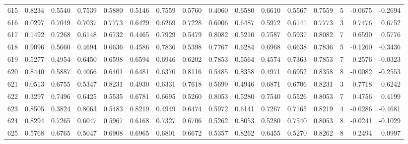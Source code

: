 \begin{tabular}{lrrrrrrrrrrrrrrr}
615 &      0.8234 &  0.5540 &  0.7539 &  0.5880 &  0.5146 &  0.7559 &  0.5760 &  0.4060 &  0.6580 &  0.6610 &   0.5567 &     0.7559 &      5 &                   -0.0675 &                    -0.2694 \\
616 &      0.0297 &  0.7049 &  0.7037 &  0.7773 &  0.6429 &  0.6269 &  0.7228 &  0.6006 &  0.6487 &  0.5972 &   0.6141 &     0.7773 &      3 &                    0.7476 &                     0.6752 \\
617 &      0.1492 &  0.7268 &  0.6148 &  0.6732 &  0.4465 &  0.7929 &  0.5479 &  0.8082 &  0.5210 &  0.7587 &   0.5937 &     0.8082 &      7 &                    0.6590 &                     0.5776 \\
618 &      0.9096 &  0.5660 &  0.4694 &  0.6636 &  0.4586 &  0.7836 &  0.5398 &  0.7767 &  0.6284 &  0.6968 &   0.6638 &     0.7836 &      5 &                   -0.1260 &                    -0.3436 \\
619 &      0.5277 &  0.4954 &  0.6450 &  0.6598 &  0.6594 &  0.6946 &  0.6202 &  0.7853 &  0.5564 &  0.4574 &   0.7363 &     0.7853 &      7 &                    0.2576 &                    -0.0323 \\
620 &      0.8440 &  0.5887 &  0.4066 &  0.6401 &  0.6481 &  0.6370 &  0.8116 &  0.5485 &  0.8358 &  0.4971 &   0.6952 &     0.8358 &      8 &                   -0.0082 &                    -0.2553 \\
621 &      0.0513 &  0.6755 &  0.5347 &  0.8231 &  0.4930 &  0.6331 &  0.7618 &  0.5699 &  0.4946 &  0.6871 &   0.6706 &     0.8231 &      3 &                    0.7718 &                     0.6242 \\
622 &      0.3297 &  0.7496 &  0.6425 &  0.5535 &  0.6781 &  0.6695 &  0.5260 &  0.8053 &  0.5280 &  0.7540 &   0.5526 &     0.8053 &      7 &                    0.4756 &                     0.4199 \\
623 &      0.8505 &  0.3824 &  0.8063 &  0.5483 &  0.8219 &  0.4949 &  0.6474 &  0.5972 &  0.6141 &  0.7267 &   0.7165 &     0.8219 &      4 &                   -0.0286 &                    -0.4681 \\
624 &      0.8294 &  0.7265 &  0.6047 &  0.5967 &  0.6168 &  0.7327 &  0.6706 &  0.5262 &  0.8053 &  0.5280 &   0.7540 &     0.8053 &      8 &                   -0.0241 &                    -0.1029 \\
625 &      0.5768 &  0.6765 &  0.5047 &  0.6908 &  0.6965 &  0.6801 &  0.6672 &  0.5357 &  0.8262 &  0.6455 &   0.5270 &     0.8262 &      8 &                    0.2494 &                     0.0997 \\

\end{tabular}
